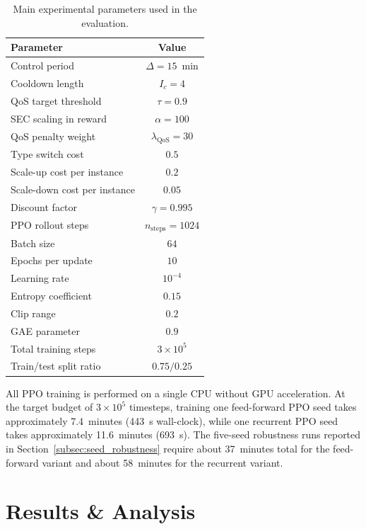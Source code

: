 \documentclass[a4paper,fleqn]{cas-sc}
\begin{document}
\begin{table}[width=.9\linewidth,cols=2,pos=h]
\centering
\caption{Main experimental parameters used in the evaluation.}
\label{tab:testbed_params}
\begin{tabular}{l c}
\hline
Parameter & Value \\
\hline
Control period & $\Delta = 15$~min \\
Cooldown length & $I_c=4$ \\
QoS target threshold & $\tau=0.9$ \\
SEC scaling in reward & $\alpha=100$ \\
QoS penalty weight & $\lambda_{\mathrm{QoS}}=30$ \\
Type switch cost & $0.5$ \\
Scale-up cost per instance & $0.2$ \\
Scale-down cost per instance & $0.05$ \\
Discount factor & $\gamma=0.995$ \\
PPO rollout steps & $n_{\mathrm{steps}}=1024$ \\
Batch size & $64$ \\
Epochs per update & $10$ \\
Learning rate & $10^{-4}$ \\
Entropy coefficient & $0.15$ \\
Clip range & $0.2$ \\
GAE parameter & $0.9$ \\
Total training steps & $3\times 10^{5}$ \\
Train/test split ratio & $0.75 / 0.25$ \\
\hline
\end{tabular}
\end{table}

All PPO training is performed on a single CPU without GPU acceleration. At the target budget of $3\times10^5$ timesteps, training one feed-forward PPO seed takes approximately 7.4~minutes (443~s wall-clock), while one recurrent PPO seed takes approximately 11.6~minutes (693~s). The five-seed robustness runs reported in Section~\ref{subsec:seed_robustness} require about 37~minutes total for the feed-forward variant and about 58~minutes for the recurrent variant.

\section{Results \& Analysis}
\label{result}
\end{document}
